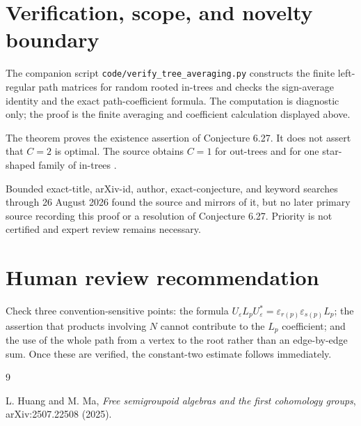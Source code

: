 \documentclass[11pt]{article}
\begin{document}
\section{Verification, scope, and novelty boundary}

The companion script \texttt{code/verify\_tree\_averaging.py} constructs the
finite left-regular path matrices for random rooted in-trees and checks the
sign-average identity and the exact path-coefficient formula.  The computation
is diagnostic only; the proof is the finite averaging and coefficient
calculation displayed above.

The theorem proves the existence assertion of Conjecture 6.27.  It does not
assert that $C=2$ is optimal.  The source obtains $C=1$ for out-trees and for
one star-shaped family of in-trees \cite[Propositions 6.25--6.26]{HM}.

Bounded exact-title, arXiv-id, author, exact-conjecture, and keyword searches
through 26 August 2026 found the source and mirrors of it, but no later primary
source recording this proof or a resolution of Conjecture 6.27.  Priority is
not certified and expert review remains necessary.

\section{Human review recommendation}

Check three convention-sensitive points: the formula
$U_\varepsilon L_pU_\varepsilon^*=\varepsilon_{r(p)}
\varepsilon_{s(p)}L_p$; the assertion that products involving $N$ cannot
contribute to the $L_p$ coefficient; and the use of the whole path from a
vertex to the root rather than an edge-by-edge sum.  Once these are verified,
the constant-two estimate follows immediately.

\sloppy
\begin{thebibliography}{9}
\raggedright
{}
L. Huang and M. Ma,
\emph{Free semigroupoid algebras and the first cohomology groups},
arXiv:2507.22508 (2025).
\end{thebibliography}
\end{document}
